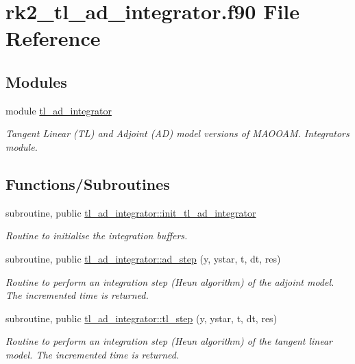 \hypertarget{rk2__tl__ad__integrator_8f90}{}\section{rk2\+\_\+tl\+\_\+ad\+\_\+integrator.\+f90 File Reference}
\label{rk2__tl__ad__integrator_8f90}
\subsection*{Modules}
\begin{DoxyCompactItemize}
\item 
module \hyperlink{namespacetl__ad__integrator}{tl\+\_\+ad\+\_\+integrator}
\begin{DoxyCompactList}\small\item\em Tangent Linear (TL) and Adjoint (AD) model versions of M\+A\+O\+O\+AM. Integrators module. \end{DoxyCompactList}\end{DoxyCompactItemize}
\subsection*{Functions/\+Subroutines}
\begin{DoxyCompactItemize}
\item 
subroutine, public \hyperlink{namespacetl__ad__integrator_aeef5ff45fe5f9b73ceb8d72c195dc381}{tl\+\_\+ad\+\_\+integrator\+::init\+\_\+tl\+\_\+ad\+\_\+integrator}
\begin{DoxyCompactList}\small\item\em Routine to initialise the integration buffers. \end{DoxyCompactList}\item 
subroutine, public \hyperlink{namespacetl__ad__integrator_a708ece5eac01486e65e889d19073fd19}{tl\+\_\+ad\+\_\+integrator\+::ad\+\_\+step} (y, ystar, t, dt, res)
\begin{DoxyCompactList}\small\item\em Routine to perform an integration step (Heun algorithm) of the adjoint model. The incremented time is returned. \end{DoxyCompactList}\item 
subroutine, public \hyperlink{namespacetl__ad__integrator_ac88b155557d4fc0bae70007fde3aef06}{tl\+\_\+ad\+\_\+integrator\+::tl\+\_\+step} (y, ystar, t, dt, res)
\begin{DoxyCompactList}\small\item\em Routine to perform an integration step (Heun algorithm) of the tangent linear model. The incremented time is returned. \end{DoxyCompactList}\end{DoxyCompactItemize}
